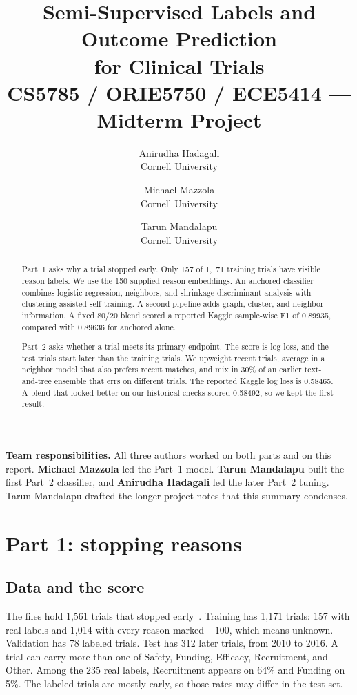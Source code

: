 \documentclass[10pt,twocolumn,letterpaper]{article}
\title{Semi-Supervised Labels and Outcome Prediction\\
for Clinical Trials\\
\vspace{0.35em}
\large CS5785 / ORIE5750 / ECE5414 --- Midterm Project}
\author{Anirudha Hadagali\\
Cornell University
\and
Michael Mazzola\\
Cornell University
\and
Tarun Mandalapu\\
Cornell University
}
\begin{document}
\maketitle

\begin{abstract}
Part~1 asks why a trial stopped early. Only 157 of 1,171 training trials have
visible reason labels. We use the 150 supplied reason embeddings. An anchored
classifier combines logistic regression, neighbors, and shrinkage discriminant
analysis with clustering-assisted self-training. A second pipeline adds graph,
cluster, and neighbor information. A fixed 80/20 blend scored a reported Kaggle
sample-wise F1 of 0.89935, compared with 0.89636 for anchored alone.

Part~2 asks whether a trial meets its primary endpoint. The score is log loss,
and the test trials start later than the training trials. We upweight recent
trials, average in a neighbor model that also prefers recent matches, and mix
in 30\% of an earlier text-and-tree ensemble that errs on different trials. The
reported Kaggle log loss is 0.58465. A blend that looked better on our
historical checks scored 0.58492, so we kept the first result.
\end{abstract}

\noindent\textbf{Team responsibilities.}
All three authors worked on both parts and on this report.
\textbf{Michael Mazzola} led the Part~1 model.
\textbf{Tarun Mandalapu} built the first Part~2 classifier, and
\textbf{Anirudha Hadagali} led the later Part~2 tuning.
Tarun Mandalapu drafted the longer project notes that this summary condenses.

\section{Part 1: stopping reasons}
\label{sec:p1}

\subsection{Data and the score}

The files hold 1,561 trials that stopped early~\cite{fu2022hint,clinicaltrials}.
Training has 1,171 trials: 157 with real labels and 1,014 with every reason
marked $-100$, which means unknown. Validation has 78 labeled trials. Test has
312 later trials, from 2010 to 2016. A trial can carry more than one of Safety,
Funding, Efficacy, Recruitment, and Other. Among the 235 real labels,
Recruitment appears on 64\% and Funding on 5\%. The labeled trials are mostly
early, so those rates may differ in the test set.
\end{document}
